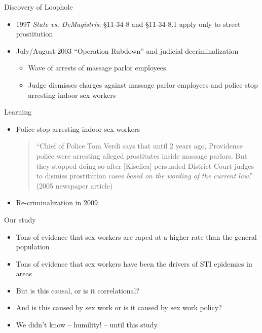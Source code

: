 \documentclass{beamer}
\begin{document}
\begin{frame}{Discovery of Loophole}
	\begin{itemize}
	\item 1997 \emph{State vs. DeMagistris}:  \S 11-34-8 and \S 11-34-8.1 apply only to street prostitution
	\item  July/August 2003 ``Operation Rubdown'' and judicial decriminalization
		\begin{itemize}
		\item Wave of arrests of massage parlor employees.
		\item Judge dismisses charges against massage parlor employees and police stop arresting indoor sex workers
		\end{itemize}
	\end{itemize}
\end{frame}


\begin{frame}{Learning}
	\begin{itemize}
		\item Police stop arresting indoor sex workers
		\bigskip
		
		\begin{quote}``Chief of Police Tom Verdi says that until 2 years ago, Providence police were arresting alleged prostitutes inside massage parlors.  But they stopped doing so after [Kiselica] persuaded District Court judges to dismiss prostitution cases \emph{based on the wording of the current law}.'' (2005 newspaper article)
		\end{quote}
		
		\item Re-criminalization in 2009
	\end{itemize}
\end{frame}

\begin{frame}{Our study}

\begin{itemize}
\item Tons of evidence that sex workers are raped at a higher rate than the general population
\item Tons of evidence that sex workers have been the drivers of STI epidemics in areas
\item But is this causal, or is it correlational?
\item And is this caused by sex work or is it caused by sex work policy?
\item We didn't know -- humility! -- until this study
\end{itemize}

\end{frame}
\end{document}
